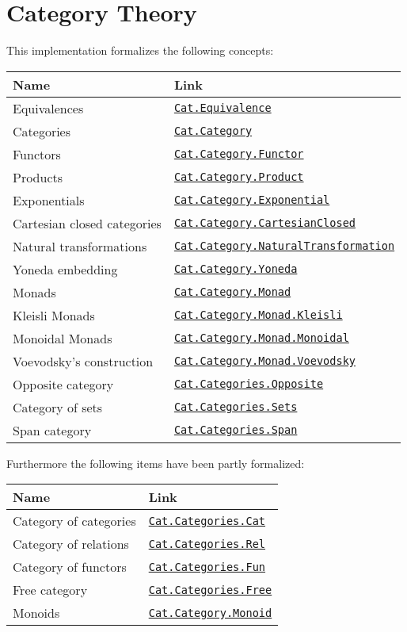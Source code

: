 \chapter{Category Theory}
\label{ch:implementation}
This implementation formalizes the following concepts:
%
\newcommand{\sourcebasepath}{http://web.student.chalmers.se/~hanghj/cat/doc/html/}
\newcommand{\sourcelink}[1]{\href{\sourcebasepath#1.html}{\texttt{#1}}}
\begin{center}
\begin{tabular}{ l l }
Name & Link \\
\hline
Equivalences & \sourcelink{Cat.Equivalence} \\
Categories & \sourcelink{Cat.Category} \\
Functors & \sourcelink{Cat.Category.Functor} \\
Products & \sourcelink{Cat.Category.Product} \\
Exponentials & \sourcelink{Cat.Category.Exponential} \\
Cartesian closed categories & \sourcelink{Cat.Category.CartesianClosed} \\
Natural transformations & \sourcelink{Cat.Category.NaturalTransformation} \\
Yoneda embedding & \sourcelink{Cat.Category.Yoneda} \\
Monads & \sourcelink{Cat.Category.Monad} \\
Kleisli Monads & \sourcelink{Cat.Category.Monad.Kleisli} \\
Monoidal Monads & \sourcelink{Cat.Category.Monad.Monoidal} \\
Voevodsky's construction & \sourcelink{Cat.Category.Monad.Voevodsky} \\
Opposite category & \sourcelink{Cat.Categories.Opposite} \\
Category of sets & \sourcelink{Cat.Categories.Sets} \\
Span category & \sourcelink{Cat.Categories.Span} \\
\end{tabular}
\end{center}
%
Furthermore the following items have been partly formalized:
%
\begin{center}
\begin{tabular}{ l l }
Name & Link \\
\hline
Category of categories & \sourcelink{Cat.Categories.Cat} \\
Category of relations & \sourcelink{Cat.Categories.Rel} \\
Category of functors & \sourcelink{Cat.Categories.Fun} \\
Free category & \sourcelink{Cat.Categories.Free} \\
Monoids & \sourcelink{Cat.Category.Monoid} \\
\end{tabular}
\end{center}
